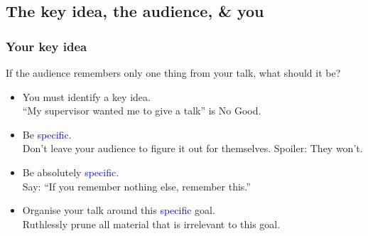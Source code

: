\documentclass[aspectratio=43,10pt,ucs]{beamer} %
\begin{document}
\subsection{The key idea, the audience, \& you}
\begin{frame}
  \frametitle{Your key idea}

  If the audience remembers only one thing from your talk, what should
  it be?

  \vspace*{1em}

  \begin{itemize}
  \item You \alert{must} identify a key idea.\\
    {\small ``My supervisor wanted me to give a talk'' is No Good.}
  \item Be \textcolor{blue}{specific}.\\
    {\small Don't leave your audience to figure it out for
      themselves. Spoiler: They won't.}
  \item Be absolutely \textcolor{blue}{specific}.\\
    {\small Say: ``If you remember nothing else, remember this.''}
  \item Organise your talk around this \textcolor{blue}{specific}
    goal.\\
    {\small Ruthlessly prune all material that is irrelevant to this
      goal.}
  \end{itemize}

\end{frame}
\end{document}
